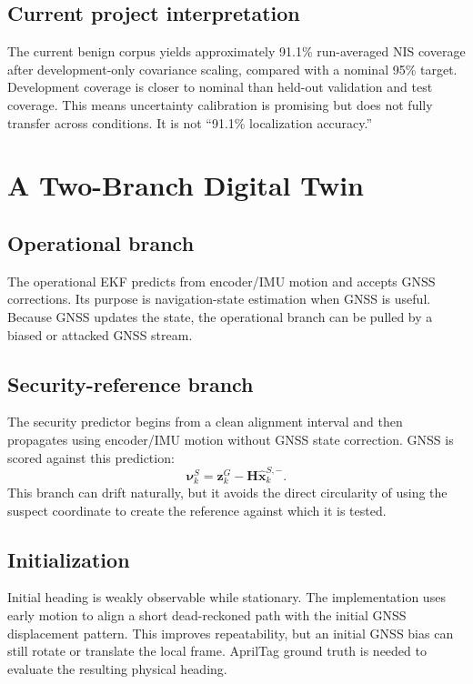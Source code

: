 \documentclass[11pt,oneside]{book}
\newcommand{\vect}[1]{\bm{#1}}
\begin{document}
\section{Current project interpretation}

The current benign corpus yields approximately 91.1\% run-averaged NIS
coverage after development-only covariance scaling, compared with a nominal
95\% target. Development coverage is closer to nominal than held-out
validation and test coverage. This means uncertainty calibration is promising
but does not fully transfer across conditions. It is not ``91.1\% localization
accuracy.''

\chapter{A Two-Branch Digital Twin}

\section{Operational branch}

The operational EKF predicts from encoder/IMU motion and accepts GNSS
corrections. Its purpose is navigation-state estimation when GNSS is useful.
Because GNSS updates the state, the operational branch can be pulled by a
biased or attacked GNSS stream.

\section{Security-reference branch}

The security predictor begins from a clean alignment interval and then
propagates using encoder/IMU motion without GNSS state correction. GNSS is
scored against this prediction:
\[
\vect{\nu}^{S}_k=\vect{z}^{G}_k-\vect{H}\hat{\vect{x}}^{S,-}_k.
\]
This branch can drift naturally, but it avoids the direct circularity of using
the suspect coordinate to create the reference against which it is tested.

\section{Initialization}

Initial heading is weakly observable while stationary. The implementation uses
early motion to align a short dead-reckoned path with the initial GNSS
displacement pattern. This improves repeatability, but an initial GNSS bias can
still rotate or translate the local frame. AprilTag ground truth is needed to
evaluate the resulting physical heading.
\end{document}
